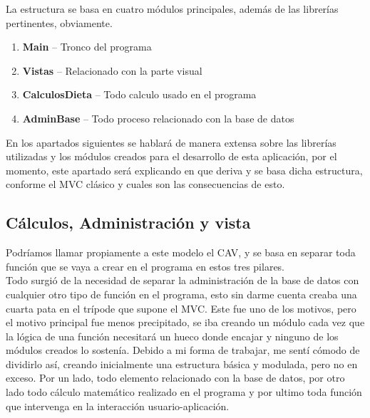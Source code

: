 La estructura se basa en cuatro módulos principales, además de las librerías pertinentes, obviamente. 
\begin{enumerate}
\item	\textbf{Main} – Tronco del programa
\item	\textbf{Vistas} – Relacionado con la parte visual
\item	\textbf{CalculosDieta} – Todo calculo usado en el programa
\item	\textbf{AdminBase} – Todo proceso relacionado con la base de datos

\end{enumerate}
En los apartados siguientes se hablará de manera extensa sobre las librerías utilizadas y los módulos creados para el desarrollo
 de esta aplicación, por el momento, este apartado será explicando en que deriva y se basa dicha estructura, conforme el MVC clásico y cuales son las consecuencias de esto.
\subsection{Cálculos, Administración y vista}
Podríamos llamar propiamente a este modelo el CAV, y se basa en separar toda función que se vaya a crear en el programa en estos tres pilares. \\
Todo surgió de la necesidad de separar la administración de la base de datos con cualquier otro tipo de función en el programa, esto sin darme cuenta creaba una cuarta pata en el trípode que supone el MVC. Este fue uno de los motivos, pero el motivo principal fue menos precipitado, se iba creando un módulo cada vez que la lógica de una función necesitará un hueco donde encajar y ninguno de los módulos creados lo sostenía. Debido a mi forma de trabajar, me sentí cómodo de dividirlo así, creando inicialmente una estructura básica y modulada, pero no en exceso. Por un lado, todo elemento relacionado con la base de datos, por otro lado todo cálculo matemático realizado en el programa y por ultimo toda función que intervenga en la interacción usuario-aplicación.\\

